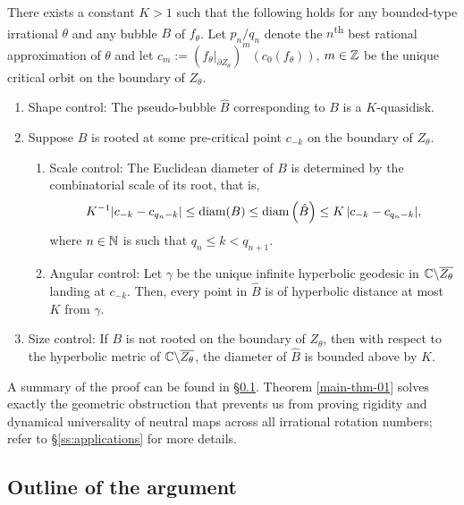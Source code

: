 \documentclass{amsart}
\begin{document}
\begin{thmx}
    \label{main-thm-01}
    There exists a constant $K> 1$ such that the following holds for any bounded-type irrational $\theta$ and any bubble $B$ of $f_\theta$. 
    Let $p_n/q_n$ denote the $n$\textsuperscript{th} best rational approximation of $\theta$ and let $c_{m} := (f_\theta|_{\partial Z_\theta} )^m (c_0(f_\theta))$, $m \in \mathbb{Z}$ be the unique critical orbit on the boundary of $Z_\theta$.
    \begin{enumerate}[label=\textnormal{(\arabic*)}]
        \item Shape control: The pseudo-bubble $\hat{B}$ corresponding to $B$ is a $K$-quasidisk.
        \item Suppose $B$ is rooted at some pre-critical point $c_{-k}$ on the boundary of $Z_\theta$. 
        \begin{enumerate}[label=\textnormal{(\alph*)}]
            \item Scale control: The Euclidean diameter of $B$ is determined by the combinatorial scale of its root, that is,
            \[
                K^{-1} |c_{-k} - c_{q_n-k}| \leq \textnormal{diam}(B) \leq \textnormal{diam}\left(\hat{B}\right) \leq K \, |c_{-k} - c_{q_n-k}|,
            \]
            where $n \in \mathbb{N}$ is such that $q_n \leq k < q_{n+1}$.
            \item Angular control: Let $\gamma$ be the unique infinite hyperbolic geodesic in $\mathbb{C} \backslash \overline{Z_\theta}$ landing at $c_{-k}$. Then, every point in $\hat{B}$ is of hyperbolic distance at most $K$ from $\gamma$.
        \end{enumerate}
        \item Size control: If $B$ is not rooted on the boundary of $Z_\theta$, then with respect to the hyperbolic metric of $\mathbb{C} \backslash \overline{Z_\theta}$, the diameter of $\hat{B}$ is bounded above by $K$.
    \end{enumerate}
\end{thmx}

A summary of the proof can be found in \S\ref{ss:summary}.
Theorem \ref{main-thm-01} solves exactly the geometric obstruction that prevents us from proving rigidity and dynamical universality of neutral maps across all irrational rotation numbers; refer to \S\ref{ss:applications} for more details.

\subsection{Outline of the argument}
\label{ss:summary}
\end{document}
